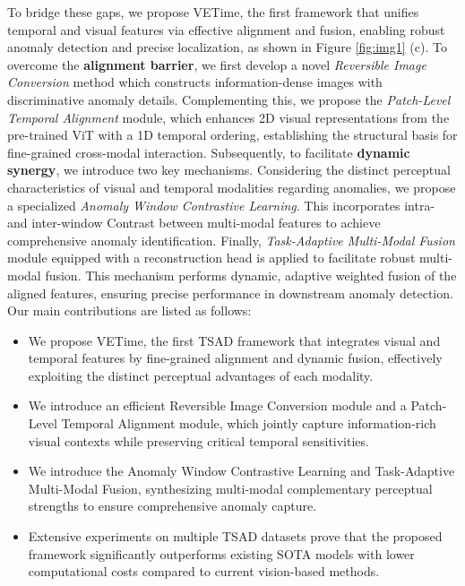 \documentclass{article}
\theoremstyle{plain}
\theoremstyle{definition}
\theoremstyle{remark}
\begin{document}
To bridge these gaps, we propose VETime, the first framework that unifies temporal and visual features via effective alignment and fusion, enabling robust anomaly detection and precise localization, as shown in Figure \ref{fig:img1} (c).
To overcome the \textbf{alignment barrier}, we first develop a novel \textit{Reversible Image Conversion} method which constructs information-dense images with discriminative anomaly details.
Complementing this, we propose the \textit{Patch-Level Temporal Alignment} module, which enhances 2D visual representations from the pre-trained ViT with a 1D temporal ordering, establishing the structural basis for fine-grained cross-modal interaction. 
Subsequently, to facilitate \textbf{dynamic synergy}, we introduce two key mechanisms. Considering the distinct perceptual characteristics of visual and temporal modalities regarding anomalies, we propose a specialized \textit{Anomaly Window Contrastive Learning}. This incorporates intra- and inter-window Contrast between multi-modal features to achieve comprehensive anomaly identification. 
Finally, \textit{Task-Adaptive Multi-Modal Fusion} module equipped with a reconstruction head is applied to facilitate robust multi-modal fusion. This mechanism performs dynamic, adaptive weighted fusion of the aligned features, ensuring precise performance in downstream anomaly detection.
Our main contributions are listed as follows:
\begin{itemize}
    \item We propose VETime, the first TSAD framework that integrates visual and temporal features by fine-grained alignment and dynamic fusion, effectively exploiting the distinct perceptual advantages of each modality.

    \item We introduce an efficient Reversible Image Conversion module and a Patch-Level Temporal Alignment module, which jointly capture information-rich visual contexts while preserving critical temporal sensitivities.
    
    \item We introduce the Anomaly Window Contrastive Learning and Task-Adaptive Multi-Modal Fusion, synthesizing multi-modal complementary perceptual strengths to ensure comprehensive anomaly capture.

    \item Extensive experiments on multiple TSAD datasets prove that the proposed framework significantly outperforms existing SOTA models with lower computational costs compared to current vision-based methods.
\end{itemize}
\end{document}
